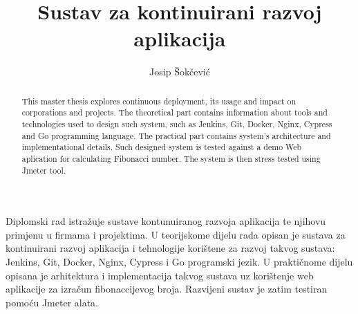\documentclass[times, utf8, numeric, diplomski]{ferit}
\begin{document}
\sloppy
{} %
\title{Sustav za kontinuirani razvoj aplikacija}

\author{Josip Šokčević}
\maketitle



\tableofcontents














\begin{sazetak}
Diplomski rad istražuje sustave kontunuiranog razvoja aplikacija te njihovu primjenu u firmama i
projektima. U teorijskome dijelu rada opisan je sustava za kontinuirani razvoj aplikacija i
tehnologije korištene za razvoj takvog sustava: Jenkins, Git, Docker, Nginx, Cypress i Go
programski jezik. U praktičnome dijelu opisana je arhitektura i implementacija takvog sustava uz
korištenje web aplikacije za izračun fibonaccijevog broja. Razvijeni sustav je zatim testiran
pomoću Jmeter alata.

\end{sazetak}

\begin{abstract}
This master thesis explores continuous deployment, its usage and impact on corporations and
projects.  The theoretical part contains information about tools and technologies used to design
such system, such as Jenkins, Git, Docker, Nginx, Cypress and Go programming language. The
practical part contains system's architecture and implementational details. Such designed system
is tested against a demo Web aplication for calculating Fibonacci number. The system is then
stress tested using Jmeter tool.

\end{abstract}


\end{document}
